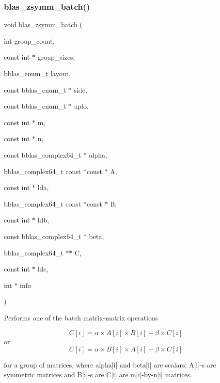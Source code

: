 \subsubsection{\texorpdfstring{blas\+\_\+zsymm\+\_\+batch()}{blas\_zsymm\_batch()}}
{\footnotesize\ttfamily void blas\+\_\+zsymm\+\_\+batch (\begin{DoxyParamCaption}\item[{int}]{group\+\_\+count,  }\item[{const int $\ast$}]{group\+\_\+sizes,  }\item[{bblas\+\_\+enum\+\_\+t}]{layout,  }\item[{const bblas\+\_\+enum\+\_\+t $\ast$}]{side,  }\item[{const bblas\+\_\+enum\+\_\+t $\ast$}]{uplo,  }\item[{const int $\ast$}]{m,  }\item[{const int $\ast$}]{n,  }\item[{const bblas\+\_\+complex64\+\_\+t $\ast$}]{alpha,  }\item[{bblas\+\_\+complex64\+\_\+t const $\ast$const $\ast$}]{A,  }\item[{const int $\ast$}]{lda,  }\item[{bblas\+\_\+complex64\+\_\+t const $\ast$const $\ast$}]{B,  }\item[{const int $\ast$}]{ldb,  }\item[{const bblas\+\_\+complex64\+\_\+t $\ast$}]{beta,  }\item[{bblas\+\_\+complex64\+\_\+t $\ast$$\ast$}]{C,  }\item[{const int $\ast$}]{ldc,  }\item[{int $\ast$}]{info }\end{DoxyParamCaption})}

Performs one of the batch matrix-\/matrix operations

\[ C[i] = \alpha \times A[i] \times B[i] + \beta \times C[i] \] or \[ C[i] = \alpha \times B[i] \times A[i] + \beta \times C[i] \]

for a group of matrices, where alpha\mbox{[}i\mbox{]} and beta\mbox{[}i\mbox{]} are scalars, A\mbox{[}i\mbox{]}-\/s are symmetric matrices and B\mbox{[}i\mbox{]}-\/s are C\mbox{[}i\mbox{]} are m\mbox{[}i\mbox{]}-\/by-\/n\mbox{[}i\mbox{]} matrices.


